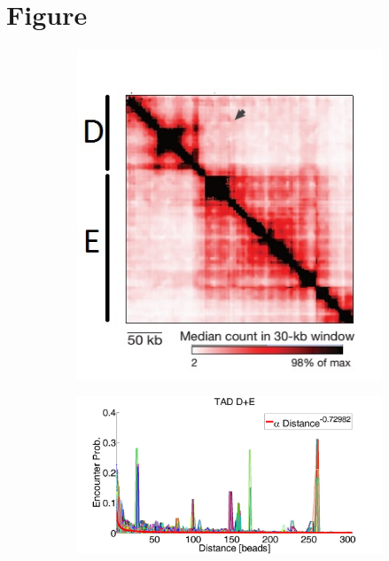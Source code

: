 \documentclass[12pt]{article}
\begin{document}
\section{Figure}\label{section_figures}
\begin{figure}[H]
\begin{subfigure}[b]{0.1\textwidth}
\includegraphics[scale=0.41]{TadDandENoraEtAl2012}
\caption{}
\end{subfigure}

\begin{subfigure}[b]{0.1\textwidth}
\includegraphics[scale=0.16]{meanDataFitTADDAndE}
\caption{}
\end{subfigure}


\end{figure}
\end{document}
